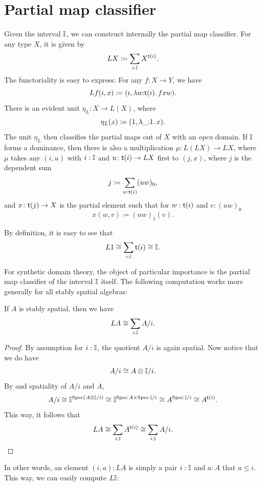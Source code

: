 \section{Partial map classifier}\label{sec:lifting}
Given the interval $\mathbb{I}$, we can construct internally the partial map classifier. For any type $X$, it is given by
\[ L X \coloneq \sum_{i:\I}X^{\ist{i}}\text{.} \]
The functoriality is easy to express: For any $f \colon X \to Y$, we have
\[ L f(i,x) \coloneq (i,\ld{w}{\ist{i}}fxw)\text{.} \]
There is an evident unit $\eta_L \colon X \to L(X)$, where
\[ \eta_L(x) \coloneq (1,\ld\_ 1 x)\text{.} \]
The unit $\eta_L$ then classifies the partial maps out of $X$ with an \emph{open} domain. If $\mathbb{I}$ forms a dominance, then there is also a multiplication $\mu \colon L(L X) \to L X$, where $\mu$ takes any $(i,u)$ with $i : \mathbb{I}$ and $u \colon \mathsf{t}(i) \to L X$ first to $(j,x)$, where $j$ is the dependent sum
\[ j \coloneq \sum_{w:\ist{i}} (uw)_0\text{,} \]
and $x \colon \mathsf{t}(j) \to X$ is the partial element such that for $w : \mathsf{t}(i)$ and $v : (uw)_0$
\[ x(w,v) \coloneq (uw)_1(v)\text{.} \]

\begin{example}
  By definition, it is easy to see that
  \[ L 1 \cong \sum_{i:\I}\ist{i} \cong \I\text{.} \]
\end{example}

For synthetic domain theory, the object of particular importance is the partial map classifier of the interval $\mathbb{I}$ itself. The following computation works more generally for all stably spatial algebras:

\begin{proposition}\label{prop:liftingofalgebra}
  If $A$ is stably spatial, then we have
  \[ L A \cong \sum_{i:\I}A/i\text{.} \]
\end{proposition}
\begin{proof}
  By assumption for $i : \mathbb{I}$, the quotient $A/i$ is again spatial. Now notice that we do have
  \[ A/i \cong A \otimes \I/i\text{.} \]
  By  and spatiality of $A/i$ and $A$,
  \[ A/i \cong \I^{\spec(A \otimes \I/i)} \cong \I^{\spec A \times \spec\I/i} \cong A^{\spec \I/i} \cong A^{\ist{i}}\text{.} \]
  This way, it follows that 
  \[ L A \cong \sum_{i:\mathbb{I}}A^{\mathsf{t}(i)} \cong \sum_{i:\mathbb{I}}A/i. \qedhere \]
\end{proof}

In other words, an element $(i,a) : L A$ is simply a pair $i : \mathbb{I}$ and $a : A$ that $a \le i$. This way, we can easily compute $L \mathbb{I}$:

